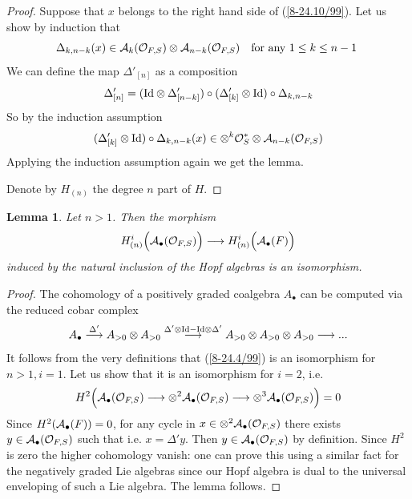 \documentclass[10pt]{article}
\newtheorem{lemma}[theorem]{Lemma}
\begin{document}
\begin{proof} Suppose that $x$ belongs to the right hand side of 
(\ref{8-24.10/99}). Let us show by induction that 
$$
\Delta_{k,n-k}(x) \in 
{\cal A}_{k}({\cal O}_{F, S}) 
\otimes {\cal A}_{n-k}({\cal O}_{F, S}) \quad \mbox{for any 
$ 1 \leq k \leq n-1$ }
$$ 
We can define the map $\Delta'_{[n]}$ as a composition
$$
\Delta'_{[n]} = ({\rm Id}\otimes \Delta'_{[n-k]}) \circ  
(\Delta'_{[k]}\otimes {\rm Id}) \circ \Delta_{k,n-k}
$$
So by the induction assumption 
$$
(\Delta'_{[k]}\otimes {\rm Id}) \circ \Delta_{k,n-k}(x) \in 
\otimes^{k}{\cal O}^*_S \otimes {\cal A}_{n-k}({\cal O}_{F, S})
$$
Applying the induction assumption again  we get the lemma. 

Denote by $H_{(n)}$ the degree $n$ part of $H$. 


\end{proof}

\begin{lemma} \label{8-24.3/99} 
Let $n>1$. Then the morphism 
\begin{equation} \label{8-24.4/99}
H_{(n)}^i\Bigl({\cal A}_{\bullet}({\cal O}_{F, S})\Bigr) \longrightarrow
H_{(n)}^i\Bigl({\cal A}_{\bullet}(F)\Bigr)
\end{equation}  
induced by the  natural inclusion of the Hopf algebras is an isomorphism. 
\end{lemma}

\begin{proof} The cohomology of a positively graded coalgebra $A_{\bullet}$ 
can be computed via the reduced cobar complex
$$
A_{\bullet} \stackrel{\Delta'}{\longrightarrow} A_{>0}\otimes A_{>0} 
\stackrel{\Delta' \otimes {\rm Id}   - {\rm Id} 
\otimes \Delta' }{\longrightarrow} A_{>0}\otimes A_{>0}\otimes A_{>0} \longrightarrow ... 
$$
It follows from the very definitions that (\ref{8-24.4/99}) is an isomorphism for $n>1, i=1$. Let us show that it is an isomorphism for $i=2$, i.e. 
$$
H^2\Bigl({\cal A}_{\bullet}({\cal O}_{F, S})  \longrightarrow \otimes^2{\cal A}_{\bullet}({\cal O}_{F, S}) \longrightarrow  \otimes^3{\cal A}_{\bullet}({\cal O}_{F, S}) \Bigr) = 0
$$
Since $H^2({\cal A}_{\bullet}(F))=0$, for any cycle in 
$x \in \otimes^2{\cal A}_{\bullet}({\cal O}_{F, S})$ 
there exists $y \in {\cal A}_{\bullet}({\cal O}_{F, S})$ such that i.e. $x = \Delta'y$.
Then $y \in {\cal A}_{\bullet}({\cal O}_{F, S})$ by definition. 
 Since  $H^2$ is zero the higher cohomology vanish: one can prove this using a similar fact for the negatively graded Lie algebras since our Hopf algebra is dual to the universal enveloping of such a Lie algebra. 
The lemma follows.


\end{proof}
\end{document}
